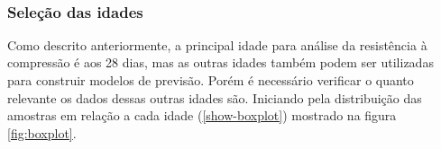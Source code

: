 \documentclass[]{article}
\begin{document}
~

\begin{table}[H]

\caption{\label{tab:similar-samples-same-id}Amostras anteriores após processamento}
\centering
{}
\end{table}

\hypertarget{seleuxe7uxe3o-das-idades}{%
\subsubsection{Seleção das idades}\label{seleuxe7uxe3o-das-idades}}

Como descrito anteriormente, a principal idade para análise da
resistência à compressão é aos 28 dias, mas as outras idades também
podem ser utilizadas para construir modelos de previsão. Porém é
necessário verificar o quanto relevante os dados dessas outras idades
são. Iniciando pela distribuição das amostras em relação a cada idade
(\ref{show-boxplot}) mostrado na figura \ref{fig:boxplot}.

~
\end{document}
